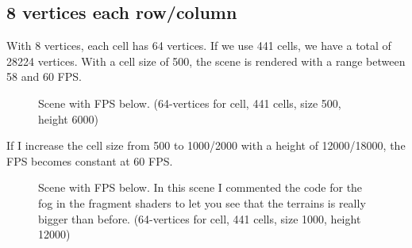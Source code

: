 \subsection{8 vertices each row/column}
With 8 vertices, each cell has 64 vertices. If we use 441 cells, we have a total of 28224 vertices. With a cell size of 500, the scene is rendered with a range between 58 and 60 FPS.

\newpage

\begin{figure}[hbt!]
	\centering
	
	\noindent{}
	
	\caption{Scene with FPS below. (64-vertices for cell, 441 cells, size 500, height 6000)}
\end{figure} 

\noindent
If I increase the cell size from 500 to 1000/2000 with a height of 12000/18000, the FPS becomes constant at 60 FPS.

\newpage

\begin{figure}[hbt!]
	\centering
	
	\noindent{}
	
	\caption{Scene with FPS below. In this scene I commented the code for the fog in the fragment shaders to let you see that the terrains is really bigger than before. (64-vertices for cell, 441 cells, size 1000, height 12000)}
\end{figure} 

